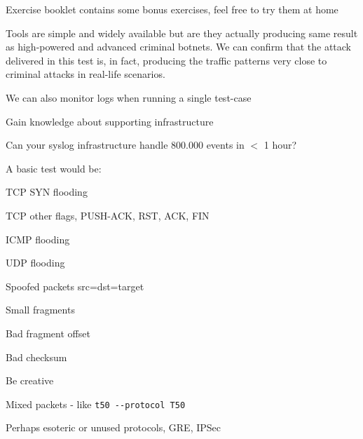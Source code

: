 \documentclass[Screen16to9,17pt]{foils}
\begin{document}

Exercise booklet contains some bonus exercises, feel free to try them at home



Tools are simple and widely available but are they actually producing same result as high-powered and advanced criminal botnets. We can confirm that the attack delivered in this test is, in fact, producing the traffic patterns very close to criminal attacks in real-life scenarios.

\begin{list2}
\item We can also monitor logs when running a single test-case
\item Gain knowledge about supporting infrastructure
\item Can your syslog infrastructure handle 800.000 events in $<$ 1 hour?
\end{list2}



A basic test would be:
\begin{list2}
\item TCP SYN flooding
\item TCP other flags, PUSH-ACK, RST, ACK, FIN
\item ICMP flooding
\item UDP flooding
\item Spoofed packets src=dst=target \smiley
\item Small fragments
\item Bad fragment offset
\item Bad checksum
\item Be creative
\item Mixed packets - like \verb+t50 --protocol T50+
\item Perhaps esoteric or unused protocols, GRE, IPSec
\end{list2}

\end{document}
